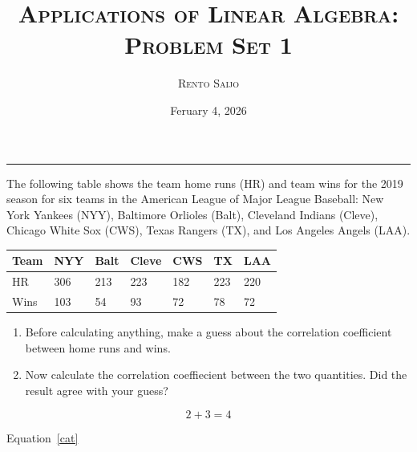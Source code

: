 \documentclass[10pt]{extarticle}
\title{\centering\Large\textsc{\textbf{Applications of Linear Algebra: Problem Set 1}}}
\author{\large \textsc{Rento Saijo}}
\date{Feruary 4, 2026}
\begin{document}
\maketitle
\thispagestyle{fancy}
\vspace{-1em}\noindent\rule{\linewidth}{0.6pt}\vspace{0.5em}

\begin{problem}
[Problem 1]
The following table shows the team home runs (HR) and team wins for the 2019 season for six teams in the American League of Major League Baseball: New York Yankees (NYY), Baltimore Orlioles (Balt), Cleveland Indians (Cleve), Chicago White Sox (CWS), Texas Rangers (TX), and Los Angeles Angels (LAA).
\begin{center}
\begin{tabular}{l|l|l|l|l|l|l}
Team & NYY & Balt & Cleve & CWS & TX & LAA \\ \hline
HR & 306 & 213 & 223 & 182 & 223 & 220 \\ \hline
Wins & 103 & 54 & 93 & 72 & 78 & 72
\end{tabular}
\end{center}
\begin{enumerate}[label=(\alph*)]
\item Before calculating anything, make a guess about the correlation coefficient between home runs and wins.
\item Now calculate the correlation coeffiecient between the two quantities. Did the result agree with your guess?
\end{enumerate}
\end{problem}

\begin{equation}
2+3 = 4
\label{cat}
\end{equation}

Equation~\ref{cat}
\end{document}
